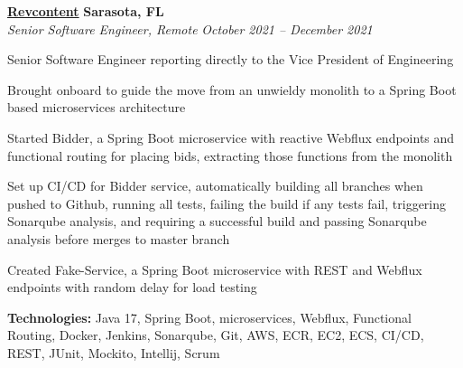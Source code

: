 %
    \headerrow
        {\textbf{\href{https://www.revcontent.com/}{Revcontent}}}
        {\textbf{Sarasota, FL}}
    \\
    \headerrow
        {\emph{Senior Software Engineer, Remote}}
        {\emph{October 2021 -- December 2021}}
    \begin{itemize*}
        \item Senior Software Engineer reporting directly to the Vice President of Engineering
        \item Brought onboard to guide the move from an unwieldy monolith to a Spring Boot based
            microservices architecture
        \item Started Bidder, a Spring Boot microservice with reactive Webflux endpoints and functional
            routing for placing bids, extracting those functions from the monolith
        \item Set up CI/CD for Bidder service, automatically building all branches when pushed to Github,
            running all tests, failing the build if any tests fail, triggering Sonarqube analysis, and requiring
            a successful build and passing Sonarqube analysis before merges to master branch
        \item Created Fake-Service, a Spring Boot microservice with REST and Webflux endpoints with random
            delay for load testing
    \end{itemize*}

    \hspace{1.0em}
        {\textbf{Technologies:} Java 17, Spring Boot, microservices, Webflux, Functional Routing,
        Docker, Jenkins, Sonarqube, Git, AWS, ECR, EC2, ECS, CI/CD, REST, JUnit, Mockito, Intellij, Scrum}

